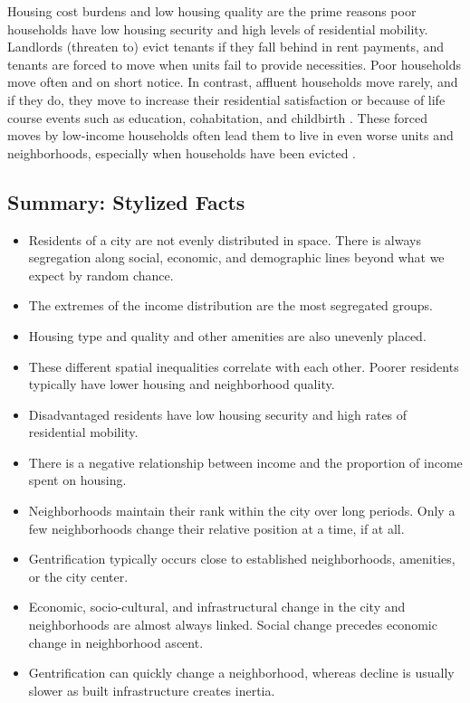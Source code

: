 \documentclass[a4paper,12pt]{article}
\begin{document}
Housing cost burdens and low housing quality are the prime reasons poor households have low housing security and high levels of residential mobility. Landlords (threaten to) evict tenants if they fall behind in rent payments, and tenants are forced to move when units fail to provide necessities. Poor households move often and on short notice. In contrast, affluent households move rarely, and if they do, they move to increase their residential satisfaction or because of life course events such as education, cohabitation, and childbirth \citep{bruchChoiceSetFormation2019, delucaNotJustLateral2020, delucaHousingInsecurityPoor2022}. These forced moves by low-income households often lead them to live in even worse units and neighborhoods, especially when households have been evicted \citep{desmondEvictedPovertyProfit2017, delucaHousingInsecurityPoor2022}. 


\subsection{Summary: Stylized Facts}

\begin{itemize}
\item Residents of a city are not evenly distributed in space. There is always segregation along social, economic, and demographic lines beyond what we expect by random chance.
\item The extremes of the income distribution are the most segregated groups.
\item Housing type and quality and other amenities are also unevenly placed.
\item These different spatial inequalities correlate with each other. Poorer residents typically have lower housing and neighborhood quality.
\item Disadvantaged residents have low housing security and high rates of residential mobility.
\item There is a negative relationship between income and the proportion of income spent on housing.
\item Neighborhoods maintain their rank within the city over long periods. Only a few neighborhoods change their relative position at a time, if at all.
\item Gentrification typically occurs close to established neighborhoods, amenities, or the city center.
\item Economic, socio-cultural, and infrastructural change in the city and neighborhoods are almost always linked. Social change precedes economic change in neighborhood ascent.
\item Gentrification can quickly change a neighborhood, whereas decline is usually slower as built infrastructure creates inertia.
\end{itemize}
\end{document}

